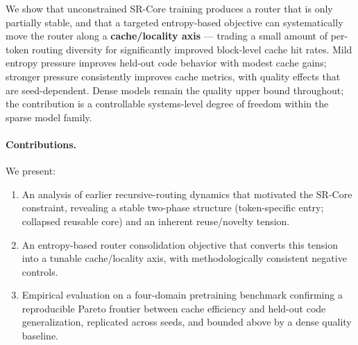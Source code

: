 We show that unconstrained SR-Core training produces a router that is only partially stable,
and that a targeted entropy-based objective can systematically move the router along a
\textbf{cache/locality axis} --- trading a small amount of per-token routing diversity for
significantly improved block-level cache hit rates.
Mild entropy pressure improves held-out code behavior with modest cache gains; stronger
pressure consistently improves cache metrics, with quality effects that are seed-dependent.
Dense models remain the quality upper bound throughout; the contribution is a controllable
systems-level degree of freedom within the sparse model family.

\paragraph{Contributions.} We present:
\begin{enumerate}
  \item An analysis of earlier recursive-routing dynamics that motivated the SR-Core
        constraint, revealing a stable two-phase structure (token-specific entry; collapsed
        reusable core) and an inherent reuse/novelty tension.
  \item An entropy-based router consolidation objective that converts this tension into a
        tunable cache/locality axis, with methodologically consistent negative controls.
  \item Empirical evaluation on a four-domain pretraining benchmark confirming a
        reproducible Pareto frontier between cache efficiency and held-out code
        generalization, replicated across seeds, and bounded above by a dense quality
        baseline.
\end{enumerate}
